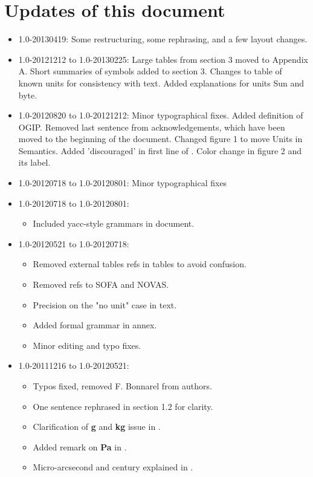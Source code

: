 \documentclass[11pt,notitlepage,onecolumn]{ivoa}
\newcommand{\unit}[1]{\textbf{\textsf{\color{orange}#1}}}
\begin{document}
\section{Updates of this document}
\begin{itemize}
\item 1.0-20130419: Some restructuring, some rephrasing, and a few layout changes.
\item 1.0-20121212 to 1.0-20130225: Large tables from section 3 moved to Appendix A. Short summaries of symbols added
to section 3. Changes to table of known units for consistency with text. Added explanations for units Sun and byte.  
\item 1.0-20120820 to 1.0-20121212:
Minor typographical fixes. Added definition of OGIP. Removed last sentence from acknowledgements, which have been moved to the beginning of the document. Changed figure 1 to move Units in Semantics. Added 'discouraged' in first line of . Color change in figure 2 and its label.
\item 1.0-20120718 to 1.0-20120801:
Minor typographical fixes
\item 1.0-20120718 to 1.0-20120801:
  \begin{itemize}
    \item Included yacc-style grammars in document.
    \end{itemize}
\item 1.0-20120521 to 1.0-20120718:
	\begin{itemize}
	\item Removed external tables refs in tables to avoid confusion.
	\item Removed refs to SOFA and NOVAS.
	\item Precision on the "no unit" case in text.
	\item Added formal grammar in annex.
	\item Minor editing and typo fixes.
	\end{itemize}
\item 1.0-20111216 to 1.0-20120521:
	\begin{itemize}
	\item Typos fixed, removed F. Bonnarel from authors. 
	\item One sentence rephrased in section 1.2 for clarity.
	\item Clarification of \unit{g} and \unit{kg} issue in .
	\item Added remark on \unit{Pa} in .
	\item Micro-arcsecond and century explained in .

\end{itemize}
\end{itemize}
\end{document}
